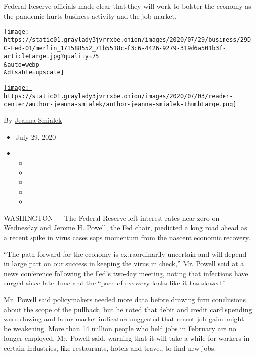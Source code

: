 Federal Reserve officials made clear that they will work to bolster the
economy as the pandemic hurts business activity and the job market.

\texttt{[image: https://static01.graylady3jvrrxbe.onion/images/2020/07/29/business/29DC-Fed-01/merlin\_171588552\_71b5518c-f3c6-4426-9279-319d6a501b3f-articleLarge.jpg?quality=75\\\&auto=webp\\\&disable=upscale]}

\href{https://www.nytimes3xbfgragh.onion/by/jeanna-smialek}{\texttt{[image: https://static01.graylady3jvrrxbe.onion/images/2020/07/03/reader-center/author-jeanna-smialek/author-jeanna-smialek-thumbLarge.png]}}

By \href{https://www.nytimes3xbfgragh.onion/by/jeanna-smialek}{Jeanna
Smialek}

\begin{itemize}
\item
  July 29, 2020
\item
  \begin{itemize}
  \item
  \item
  \item
  \item
  \item
  \end{itemize}
\end{itemize}

WASHINGTON --- The Federal Reserve left interest rates near zero on
Wednesday and Jerome H. Powell, the Fed chair, predicted a long road
ahead as a recent spike in virus cases saps momentum from the nascent
economic recovery.

``The path forward for the economy is extraordinarily uncertain and will
depend in large part on our success in keeping the virus in check,'' Mr.
Powell said at a news conference following the Fed's two-day meeting,
noting that infections have surged since late June and the ``pace of
recovery looks like it has slowed.''

Mr. Powell said policymakers needed more data before drawing firm
conclusions about the scope of the pullback, but he noted that debit and
credit card spending were slowing and labor market indicators suggested
that recent job gains might be weakening. More than
\href{https://fred.stlouisfed.org/series/PAYEMS\#:~:text=Notes\%3A,and\%20the\%20unincorporated\%20self\%2Demployed.}{14
million} people who held jobs in February are no longer employed, Mr.
Powell said, warning that it will take a while for workers in certain
industries, like restaurants, hotels and travel, to find new jobs.

